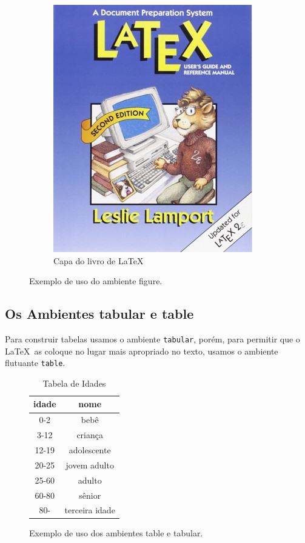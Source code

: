 \begin{figure}[hbt]
    \begin{LTXexample}[pos=b]
\begin{figure}[htb]
\centering
\includegraphics[height=0.3\textheight]{Images/Picture6}
\caption{Capa do livro de \LaTeX\ }
\label{fig:picture6}
\end{figure}
    \end{LTXexample}
    \caption{Exemplo de uso do ambiente figure.}
    \label{fig:fig}
\end{figure}

\subsection{Os Ambientes tabular e table}

Para construir tabelas usamos o ambiente \lstinline|tabular|, porém, para permitir que o \LaTeX\ as coloque no lugar mais apropriado no texto, usamos o ambiente flutuante \lstinline|table|.

\begin{figure}
    \begin{LTXexample}[pos=b]
    \begin{table}
    \caption{Tabela de Idades}
    \centering
    \label{tab:idades}
    \begin{tabular}{|c|c|}
    \hline
    \textbf{idade} & \textbf{nome} \\
    \hline
    0-2   & bebê \\
    3-12  & criança \\
    12-19 & adolescente \\
    20-25 & jovem adulto \\
    25-60 & adulto \\
    60-80 & sênior \\
    80-   & terceira idade \\
    \hline
    \end{tabular}
    \end{table}
    \end{LTXexample}
    \caption{Exemplo de uso dos ambientes table e tabular.}
\label{fig:tabtab}
\end{figure}

